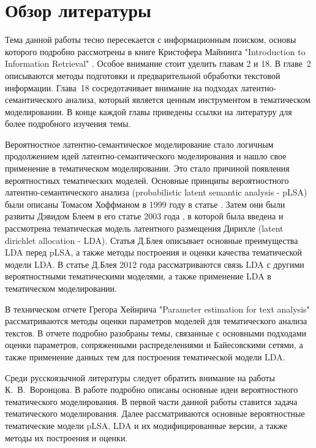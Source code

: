 \documentclass[a4paper]{report}
\begin{document}
	\section{Обзор литературы}
	
	Тема данной работы тесно пересекается с информационным поиском, основы которого подробно рассмотрены в книге Кристофера Майнинга "Introduction to Information Retrieval" \cite{bib:InformationRetrieval}. Особое внимание стоит уделить главам 2 и 18. В главе~2 описываются методы подготовки и предварительной обработки текстовой информации. Глава~18 сосредотачивает внимание на подходах латентно-семантического анализа, который является ценным инструментом в тематическом моделировании. В конце каждой главы приведены ссылки на литературу для более подробного изучения темы. 
	
	Вероятностное латентно-семантическое моделирование стало логичным продолжением идей латентно-семантического моделирования и нашло свое применение в тематическом моделировании. Это стало причиной появления вероятностных тематических моделей. Основные принципы вероятностного латентно-семантического анализа (probabilistic latent semantic analysis - pLSA) были описаны Томасом Хоффманом в 1999 году в статье \cite{bib:Hoffman}. Затем они были развиты Дэвидом Блеем в его статье 2003 года \cite{bib:Blei}, в которой была введена и рассмотрена тематическая модель латентного размещения Дирихле (latent dirichlet allocation - LDA). Статья Д.Блея описывает основные преимущества LDA перед pLSA, а также методы построения и оценки качества тематической модели LDA. В статье Д.Блея 2012 года \cite{bib:Blei2} рассматриваются связь LDA с другими вероятностными тематическими моделями, а также применение LDA в тематическом моделировании.
	
	В техническом отчете Грегора Хейнрича "Parameter estimation for text analysis" \cite{bib:Heinrich}  рассматриваются методы оценки параметров моделей для тематического анализа текстов. В отчете подробно разобраны темы, связанные с основными подходами оценки параметров, сопряженными распределениями и Байесовскими сетями, а также применение данных тем для построения тематической модели LDA. 
	
	 Среди русскоязычной литературы следует обратить внимание на работы К.~В.~Воронцова.  В работе \cite{bib:Voron1} подробно описаны основные идеи вероятностного тематического моделирования. В первой части данной работы ставится задача тематического моделирования. Далее рассматриваются основные вероятностные тематические модели pLSA, LDA и их модифицированные версии, а также методы их построения и оценки.
	
\end{document}
